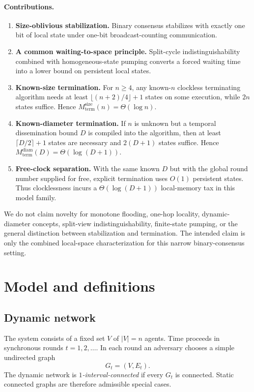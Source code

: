 \documentclass[11pt]{article}
\theoremstyle{remark}
\begin{document}
\paragraph{Contributions.}
\begin{enumerate}[leftmargin=1.5em]
\item \textbf{Size-oblivious stabilization.} Binary consensus stabilizes with exactly one bit of local state under one-bit broadcast-counting communication.
\item \textbf{A common waiting-to-space principle.} Split-cycle indistinguishability combined with homogeneous-state pumping converts a forced waiting time into a lower bound on persistent local states.
\item \textbf{Known-size termination.} For $n\ge4$, any known-$n$ clockless terminating algorithm needs at least $\lfloor(n+2)/4\rfloor+1$ states on some execution, while $2n$ states suffice. Hence $M_{\mathrm{term}}^{\mathrm{size}}(n)=\Theta(\log n)$.
\item \textbf{Known-diameter termination.} If $n$ is unknown but a temporal dissemination bound $D$ is compiled into the algorithm, then at least $\lceil D/2\rceil+1$ states are necessary and $2(D+1)$ states suffice. Hence $M_{\mathrm{term}}^{\mathrm{diam}}(D)=\Theta(\log(D+1))$.
\item \textbf{Free-clock separation.} With the same known $D$ but with the global round number supplied for free, explicit termination uses $O(1)$ persistent states. Thus clocklessness incurs a $\Theta(\log(D+1))$ local-memory tax in this model family.
\end{enumerate}

We do not claim novelty for monotone flooding, one-hop locality, dynamic-diameter concepts, split-view indistinguishability, finite-state pumping, or the general distinction between stabilization and termination. The intended claim is only the combined local-space characterization for this narrow binary-consensus setting.

\section{Model and definitions}
\subsection{Dynamic network}
The system consists of a fixed set $V$ of $|V|=n$ agents. Time proceeds in synchronous rounds $t=1,2,\ldots$. In each round an adversary chooses a simple undirected graph
\[
G_t=(V,E_t).
\]
The dynamic network is \emph{$1$-interval-connected} if every $G_t$ is connected. Static connected graphs are therefore admissible special cases.
\end{document}
